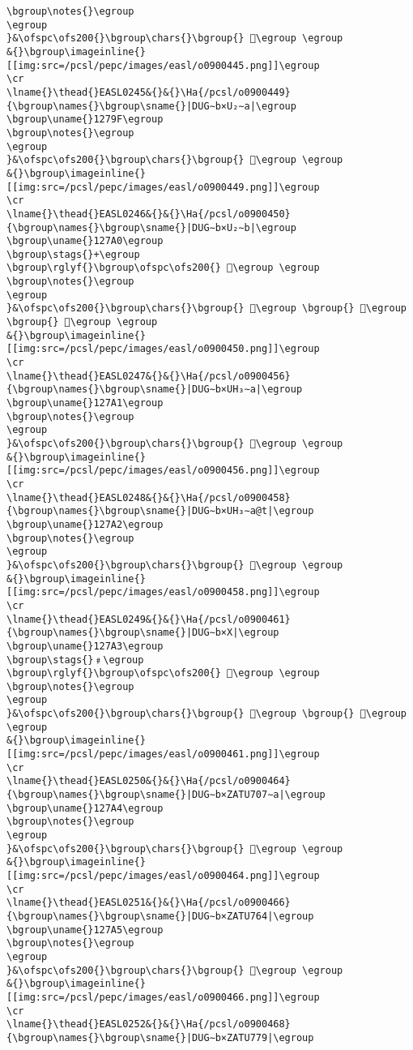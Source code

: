 \begin{verbatim}
\bgroup\notes{}\egroup
\egroup
}&\ofspc\ofs200{}\bgroup\chars{}\bgroup{} 𒞞\egroup \egroup
&{}\bgroup\imageinline{}[[img:src=/pcsl/pepc/images/easl/o0900445.png]]\egroup
\cr
\lname{}\thead{}EASL0245&{}&{}\Ha{/pcsl/o0900449}{\bgroup\names{}\bgroup\sname{}|DUG∼b×U₂∼a|\egroup
\bgroup\uname{}1279F\egroup
\bgroup\notes{}\egroup
\egroup
}&\ofspc\ofs200{}\bgroup\chars{}\bgroup{} 𒞟\egroup \egroup
&{}\bgroup\imageinline{}[[img:src=/pcsl/pepc/images/easl/o0900449.png]]\egroup
\cr
\lname{}\thead{}EASL0246&{}&{}\Ha{/pcsl/o0900450}{\bgroup\names{}\bgroup\sname{}|DUG∼b×U₂∼b|\egroup
\bgroup\uname{}127A0\egroup
\bgroup\stags{}+\egroup
\bgroup\rglyf{}\bgroup\ofspc\ofs200{} 𒞠\egroup \egroup
\bgroup\notes{}\egroup
\egroup
}&\ofspc\ofs200{}\bgroup\chars{}\bgroup{} 𒞶\egroup \bgroup{} 𒞺\egroup \bgroup{} 𒞠\egroup \egroup
&{}\bgroup\imageinline{}[[img:src=/pcsl/pepc/images/easl/o0900450.png]]\egroup
\cr
\lname{}\thead{}EASL0247&{}&{}\Ha{/pcsl/o0900456}{\bgroup\names{}\bgroup\sname{}|DUG∼b×UH₃∼a|\egroup
\bgroup\uname{}127A1\egroup
\bgroup\notes{}\egroup
\egroup
}&\ofspc\ofs200{}\bgroup\chars{}\bgroup{} 𒞡\egroup \egroup
&{}\bgroup\imageinline{}[[img:src=/pcsl/pepc/images/easl/o0900456.png]]\egroup
\cr
\lname{}\thead{}EASL0248&{}&{}\Ha{/pcsl/o0900458}{\bgroup\names{}\bgroup\sname{}|DUG∼b×UH₃∼a@t|\egroup
\bgroup\uname{}127A2\egroup
\bgroup\notes{}\egroup
\egroup
}&\ofspc\ofs200{}\bgroup\chars{}\bgroup{} 𒞢\egroup \egroup
&{}\bgroup\imageinline{}[[img:src=/pcsl/pepc/images/easl/o0900458.png]]\egroup
\cr
\lname{}\thead{}EASL0249&{}&{}\Ha{/pcsl/o0900461}{\bgroup\names{}\bgroup\sname{}|DUG∼b×X|\egroup
\bgroup\uname{}127A3\egroup
\bgroup\stags{}﹟\egroup
\bgroup\rglyf{}\bgroup\ofspc\ofs200{} 𒞣\egroup \egroup
\bgroup\notes{}\egroup
\egroup
}&\ofspc\ofs200{}\bgroup\chars{}\bgroup{} 𒞷\egroup \bgroup{} 𒞣\egroup \egroup
&{}\bgroup\imageinline{}[[img:src=/pcsl/pepc/images/easl/o0900461.png]]\egroup
\cr
\lname{}\thead{}EASL0250&{}&{}\Ha{/pcsl/o0900464}{\bgroup\names{}\bgroup\sname{}|DUG∼b×ZATU707∼a|\egroup
\bgroup\uname{}127A4\egroup
\bgroup\notes{}\egroup
\egroup
}&\ofspc\ofs200{}\bgroup\chars{}\bgroup{} 𒞤\egroup \egroup
&{}\bgroup\imageinline{}[[img:src=/pcsl/pepc/images/easl/o0900464.png]]\egroup
\cr
\lname{}\thead{}EASL0251&{}&{}\Ha{/pcsl/o0900466}{\bgroup\names{}\bgroup\sname{}|DUG∼b×ZATU764|\egroup
\bgroup\uname{}127A5\egroup
\bgroup\notes{}\egroup
\egroup
}&\ofspc\ofs200{}\bgroup\chars{}\bgroup{} 𒞥\egroup \egroup
&{}\bgroup\imageinline{}[[img:src=/pcsl/pepc/images/easl/o0900466.png]]\egroup
\cr
\lname{}\thead{}EASL0252&{}&{}\Ha{/pcsl/o0900468}{\bgroup\names{}\bgroup\sname{}|DUG∼b×ZATU779|\egroup

\end{verbatim}
